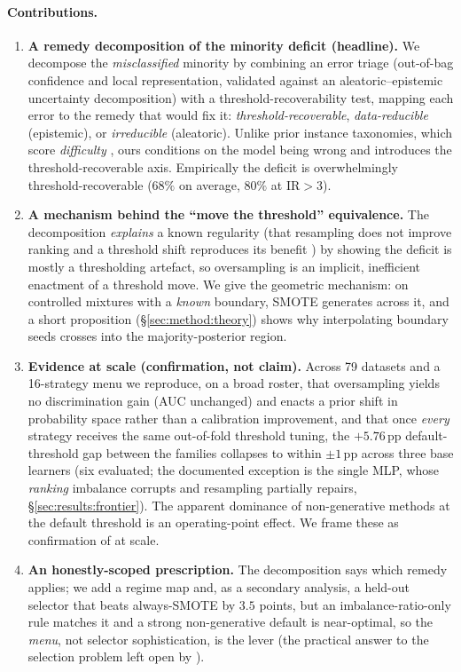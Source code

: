 \paragraph{Contributions.}
\begin{enumerate}
\item \textbf{A remedy decomposition of the minority deficit (headline).} We
  decompose the \emph{misclassified} minority by combining an error triage
  (out-of-bag confidence and local representation, validated against an
  aleatoric--epistemic uncertainty decomposition) with a threshold-recoverability
  test, mapping each error to the remedy that would fix it:
  \emph{threshold-recoverable}, \emph{data-reducible} (epistemic), or
  \emph{irreducible} (aleatoric). Unlike prior
  instance taxonomies, which score \emph{difficulty}
  \cite{napierala2016types,smith2014instance,swayamdipta2020dataset,seedat2022dataiq},
  ours conditions on the model being wrong and introduces the threshold-recoverable
  axis. Empirically the deficit is overwhelmingly threshold-recoverable
  ($68\%$ on average, $80\%$ at $\mathrm{IR}>3$).
\item \textbf{A mechanism behind the ``move the threshold'' equivalence.} The
  decomposition \emph{explains} a known regularity (that resampling does not
  improve ranking and a threshold shift reproduces its benefit
  \cite{provost2000imbalanced,elkan2001foundations,elor2022smote,goorbergh2022harm})
  by showing the deficit is mostly a thresholding artefact, so oversampling is
  an implicit, inefficient enactment of a threshold move. We give the geometric
  mechanism: on controlled mixtures with a \emph{known} boundary, SMOTE generates
  across it, and a short proposition (\S\ref{sec:method:theory}) shows why
  interpolating boundary seeds crosses into the majority-posterior region.
\item \textbf{Evidence at scale (confirmation, not claim).} Across 79 datasets and
  a 16-strategy menu we reproduce, on a broad roster, that oversampling yields no
  discrimination gain (AUC unchanged) and enacts a prior shift in probability
  space rather than a calibration improvement, and that once
  \emph{every} strategy receives the same out-of-fold threshold tuning, the
  $+5.76$\,pp default-threshold gap between the families collapses to within
  $\pm1$\,pp across three base learners (six evaluated; the documented exception
  is the single MLP, whose \emph{ranking} imbalance corrupts and resampling
  partially repairs, \S\ref{sec:results:frontier}). The apparent dominance of non-generative
  methods at the default threshold is an operating-point effect. We frame these as confirmation of
  \cite{elor2022smote,goorbergh2022harm,dalpozzolo2015calibrating} at scale.
\item \textbf{An honestly-scoped prescription.} The decomposition says which remedy
  applies; we add a regime map and, as a secondary analysis, a held-out selector
  that beats always-SMOTE by $3.5$ points, but an imbalance-ratio-only rule
  matches it and a strong non-generative default is near-optimal, so the
  \emph{menu}, not selector sophistication, is the lever (the practical answer to
  the selection problem left open by \cite{jiang2026beyond}).
\end{enumerate}
